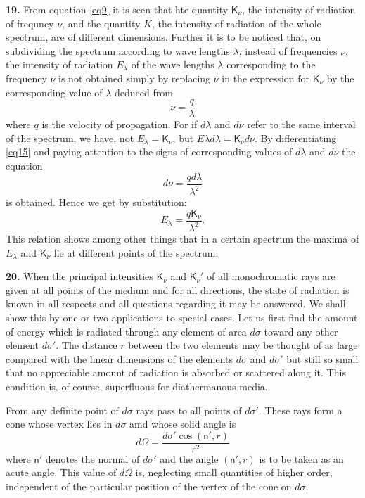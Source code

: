 \documentclass[12pt,oneside]{book}
\begin{document}
\textbf{19.} From equation \eqref{eq9} it is seen that hte quantity $\mathsf{K}_\nu$, the intensity of radiation of frequncy $\nu$, and the quantity $K$, the intensity of radiation of the whole spectrum, are of different dimensions. Further it is to be noticed that, on subdividing the spectrum according to wave lengths $\lambda$, instead of frequencies $\nu$, the intensity of radiation $E_\lambda$ of the wave lengths $\lambda$ corresponding to the frequency $\nu$ is not obtained simply by replacing $\nu$ in the expression for $\mathsf{K}_\nu$ by the corresponding value of $\lambda$ deduced from 
\begin{equation}
    \nu=\frac{q}{\lambda}
    \label{eq15}
\end{equation}
where $q$ is the velocity of propagation. For if $d\lambda$ and $d\nu$ refer to the same interval of the spectrum, we have, not $E_\lambda=\mathsf{K}_\nu$, but $E\lambda d\lambda=\mathsf{K}_\nu d\nu$. By differentiating \eqref{eq15} and paying attention to the signs of corresponding values of $d\lambda$ and $d\nu$ the equation 
\begin{equation*}
    d\nu=\frac{qd\lambda}{\lambda^2}
\end{equation*}
is obtained. Hence we get by substitution:
\begin{equation}
    \label{eq16}
    E_\lambda=\frac{q\mathsf{K}_\nu}{\lambda^2}.
\end{equation}
This relation shows among other things that in a certain spectrum the maxima of $E_\lambda$ and $\mathsf{K}_\nu$ lie at different points of the spectrum. \par 

\textbf{20.} When the principal intensities $\mathsf{K}_\nu$ and $\mathsf{K}_\nu'$ of all monochromatic rays are given at all points of the medium and for all directions, the state of radiation is known in all respects and all questions regarding it may be answered. We shall show this by one or two applications to special cases. Let us first find the amount of energy which is radiated through any element of area $d\sigma$ toward any other element $d\sigma'$. The distance $r$ between the two elements may be thought of as large compared with the linear dimensions of the elements $d\sigma$ and $d\sigma'$ but still so small that no appreciable amount of radiation is absorbed or scattered along it. This condition is, of course, superfluous for diathermanous media. \par 

From any definite point of $d\sigma$ rays pass to all points of $d\sigma'$. These rays form a cone whose vertex lies in $d\sigma$ amd whose solid angle is 
\begin{equation*}
    d\Omega=\frac{d\sigma'\cos(\mathsf{n}',r)}{r^2}
\end{equation*}
where $\mathsf{n}'$ denotes the normal of $d\sigma'$ and the angle $(\mathsf{n}',r)$ is to be taken as an acute angle. This value of $d\Omega$ is, neglecting small quantities of higher order, independent of the particular position of the vertex of the cone on $d\sigma$. \par 
\end{document}
